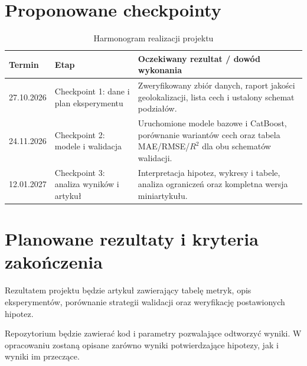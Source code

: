 \documentclass[10pt,a4paper]{article}
\begin{document}
	
	\newpage
	\section{Proponowane checkpointy}
	
	\begin{table}[htbp]
		\centering
		\small
		\caption{Harmonogram realizacji projektu}
		\label{tab:checkpointy}
		
		\begin{tabularx}{\textwidth}{
				@{}
				p{2.1cm}
				p{4.2cm}
				X
				@{}
			}
			\toprule
			\textbf{Termin}
			&
			\textbf{Etap}
			&
			\textbf{Oczekiwany rezultat / dowód wykonania}
			\\
			\midrule
			
			27.10.2026
			&
			Checkpoint 1: dane i plan eksperymentu
			&
			Zweryfikowany zbiór danych, raport jakości geolokalizacji,
			lista cech i ustalony schemat podziałów.
			\\
			
			24.11.2026
			&
			Checkpoint 2: modele i walidacja
			&
			Uruchomione modele bazowe i CatBoost, porównanie wariantów
			cech oraz tabela MAE/RMSE/$R^2$ dla obu schematów walidacji.
			\\
			
			12.01.2027
			&
			Checkpoint 3: analiza wyników i artykuł
			&
			Interpretacja hipotez, wykresy i tabele, analiza ograniczeń
			oraz kompletna wersja miniartykułu.
			\\
			
			\bottomrule
		\end{tabularx}
	\end{table}
	
	
	\section{Planowane rezultaty i kryteria zakończenia}
	
	Rezultatem projektu będzie artykuł zawierający tabelę metryk,
	opis eksperymentów, porównanie strategii walidacji oraz weryfikację
	postawionych hipotez.
	
	Repozytorium będzie zawierać kod i parametry pozwalające odtworzyć
	wyniki. W opracowaniu zostaną opisane zarówno wyniki potwierdzające
	hipotezy, jak i wyniki im przeczące.
	
\end{document}
